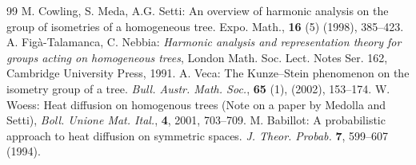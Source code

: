 \documentclass[10pt,a4paper]{amsart}
\theoremstyle{plain}
\theoremstyle{remark}
\theoremstyle{definition}
\begin{document}
\begin{thebibliography}{99}
 M. Cowling, S. Meda, A.G. Setti: An overview of harmonic analysis on the group of isometries of a homogeneous tree. Expo. Math., \textbf{16} (5) (1998), 385--423.
 A. Fig{\`a}-Talamanca, C. Nebbia: \textit{Harmonic analysis and representation theory for groups acting on homogeneous trees}, London Math. Soc. Lect. Notes Ser. 162, Cambridge University Press, 1991.
 A. Veca: The Kunze–Stein phenomenon on the isometry group of a tree. \textit{Bull. Austr. Math. Soc.}, \textbf{65} (1), (2002), 153--174.
 W. Woess: Heat diffusion on homogenous trees (Note on a paper by Medolla and Setti), \textit{Boll. Unione Mat. Ital.}, \textbf{4}, 2001, 703--709.
 M. Babillot: A probabilistic approach to heat diffusion on symmetric spaces. \textit{J. Theor. Probab.} \textbf{7}, 599–607 (1994).
\end{thebibliography}
\end{document}
